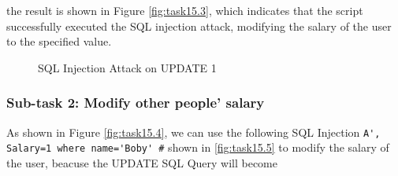 \documentclass[a4paper,11pt]{article}
\begin{document}
the result is shown in Figure \ref{fig:task15.3}, which indicates that the script successfully executed the SQL injection attack, modifying the salary of the user to the specified value.
\begin{figure}[h]
    \centering
    \hfill
    \hfill
    \hfill
    \caption{SQL Injection Attack on UPDATE 1}\label{fig:task15-1}
\end{figure}

\subsubsection{Sub-task 2: Modify other people’ salary}

As shown in Figure \ref{fig:task15.4}, we can use the following SQL Injection \verb|A', Salary=1 where name='Boby' #| shown in \ref{fig:task15.5} to modify the salary of the user, beacuse the UPDATE SQL Query will become 
\end{document}
